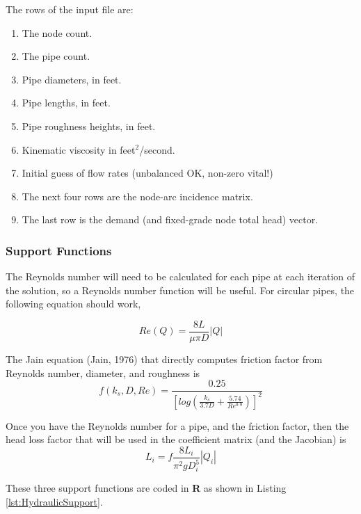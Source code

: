 The rows of the input file are:
\begin{enumerate}
\item The node count.
\item The pipe count.
\item Pipe diameters, in feet.
\item Pipe lengths, in feet.
\item Pipe roughness heights, in feet.
\item Kinematic viscosity in feet$^2$/second.
\item Initial guess of flow rates (unbalanced OK, non-zero vital!)
\item The next four rows are the node-arc incidence matrix.
\item The last row is the demand (and fixed-grade node total head) vector.
\end{enumerate}

\subsubsection{Support Functions}
The Reynolds number will need to be calculated for each pipe at each iteration of the solution, so a Reynolds number function will be useful.  For circular pipes, the following equation should work,

\begin{equation}
{Re(Q)}=\frac{8L}{\mu \pi D}|Q|
\end{equation}

The Jain equation (Jain, 1976) that directly computes friction factor from Reynolds number, diameter, and roughness is 
\begin{equation}
f(k_s,D,Re) = \frac{0.25}{[log(\frac{k_s}{3.7D} + \frac{5.74}{Re^{0.9}})]^2}
\end{equation}

Once you have the Reynolds number for a pipe, and the friction factor, then the head loss factor that will be used in the coefficient matrix (and the Jacobian) is 
\begin{equation}
L_i = f \frac{8 L_i}{\pi^2 g D_i^5} |Q_i|
\end{equation}

These three support functions are coded in \textbf{R} as shown in Listing \ref{lst:HydraulicSupport}.

